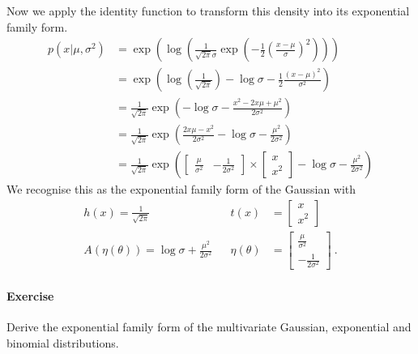 \documentclass[a4paper, 11pt]{article}
\begin{document}
Now we apply the identity function to transform this density into its exponential family form.
\begin{subequations}
\begin{align}
p(x|\mu, \sigma^{2}) &= \exp \left( \log \left( \frac{1}{\sqrt{2\pi}\sigma} \exp \left(-\frac{1}{2}\left(\frac{x - \mu}{\sigma}\right)^{2}\right) \right) \right) \\
&= \exp \left( \log \left( \frac{1}{\sqrt{2\pi}} \right) - \log \sigma -\frac{1}{2}\frac{(x - \mu)^{2}}{\sigma^{2}}\right) \\
&= \frac{1}{\sqrt{2\pi}}\exp \left( - \log \sigma -\frac{x^{2} - 2x\mu + \mu^{2}}{2\sigma^{2}}\right) \\
&= \frac{1}{\sqrt{2\pi}} \exp \left(\frac{2x\mu -x^{2}}{2\sigma^{2}} - \log\sigma - \frac{\mu^{2}}{2\sigma^{2}}\right) \\
&= \frac{1}{\sqrt{2\pi}} \exp \left( 
\begin{bmatrix} \frac{\mu}{\sigma^{2}} & -\frac{1}{2\sigma^{2}} \end{bmatrix} \times 
\begin{bmatrix} x \\ x^{2} \end{bmatrix}
- \log\sigma - \frac{\mu^{2}}{2\sigma^{2}}\right)
\end{align}
\end{subequations}
We recognise this as the exponential family form of the Gaussian with
\begin{equation}
\begin{aligned}
h(x) = \frac{1}{\sqrt{2\pi}} && t(x) &= \begin{bmatrix} x \\ x^{2} \end{bmatrix} \\
A(\eta(\theta)) = \log \sigma + \frac{\mu^{2}}{2\sigma^{2}} && \eta(\theta) &= \begin{bmatrix} \frac{\mu}{\sigma^{2}} \\ -\frac{1}{2\sigma^{2}} \end{bmatrix} \ .
\end{aligned}
\end{equation}

\paragraph{Exercise} Derive the exponential family form of the multivariate Gaussian, exponential and binomial distributions.
\end{document}
